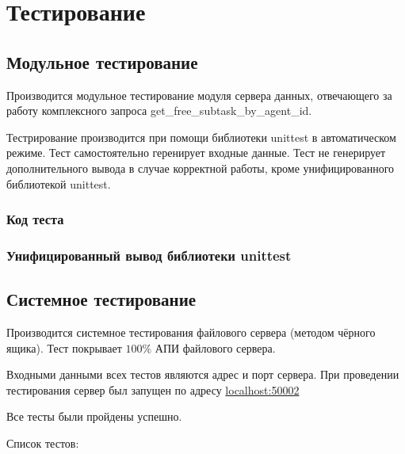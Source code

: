\documentclass[a4paper,12pt]{report}
\date{\today}
\numberwithin{equation}{section}
\begin{document}
\section{Тестирование}
\subsection{Модульное тестирование}
Производится модульное тестирование модуля сервера данных, отвечающего за работу комплексного запроса get\_free\_subtask\_by\_agent\_id.


Тестрирование производится при помощи библиотеки unittest в автоматическом режиме.
Тест самостоятельно геренирует входные данные.
Тест не генерирует дополнительного вывода в случае корректной работы, кроме унифицированного библиотекой unittest.


\subsubsection{Код теста}


\subsubsection{Унифицированный вывод библиотеки unittest}



\subsection{Системное тестирование}
Производится системное тестирования файлового сервера (методом чёрного ящика).
Тест покрывает $100\%$ АПИ файлового сервера.

Входными данными всех тестов являются адрес и порт сервера.
При проведении тестирования сервер был запущен по адресу \url{localhost:50002}

Все тесты были пройдены успешно.

Список тестов:
\end{document}
